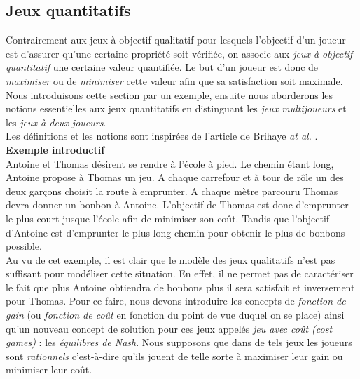 
\subsection{Jeux quantitatifs }

Contrairement aux jeux à objectif qualitatif pour lesquels l'objectif d'un joueur est d'assurer qu'une certaine propriété soit vérifiée, on associe aux \textit{jeux à objectif quantitatif} une certaine valeur quantifiée. Le but d'un joueur est donc de \textit{maximiser} ou de \textit{minimiser} cette valeur afin que sa satisfaction soit maximale.\\

Nous introduisons cette section par un exemple, ensuite nous aborderons les notions essentielles aux jeux quantitatifs en distinguant les \textit{jeux multijoueurs} et les \textit{jeux à deux joueurs}.\\
Les définitions et les notions sont inspirées de l'article de Brihaye \emph{at al.} \cite{DBLP:conf/lfcs/BrihayePS13}.\\

\noindent\textbf {Exemple introductif} \\
\indent Antoine et Thomas désirent se rendre à l'école à pied. Le chemin étant long, Antoine propose à Thomas un jeu. A chaque carrefour et à tour de rôle un des deux garçons choisit la route à emprunter. A chaque mètre parcouru Thomas devra donner un bonbon à Antoine. L'objectif de Thomas est donc d'emprunter le plus court jusque l'école afin de minimiser son coût. Tandis que l'objectif d'Antoine est d'emprunter le plus long chemin pour obtenir le plus de bonbons possible.\\

Au vu de cet exemple, il est clair que le modèle des jeux qualitatifs n'est pas suffisant pour modéliser cette situation. En effet, il ne permet pas de caractériser le fait que plus Antoine obtiendra de bonbons plus il sera satisfait et inversement pour Thomas. Pour ce faire, nous devons introduire les concepts de \textit{fonction de gain} (ou \textit{fonction de coût} en fonction du point de vue duquel on se place) ainsi qu'un nouveau concept de solution pour ces jeux appelés \textit{jeu avec coût (cost games)} : les \textit{équilibres de Nash}. Nous supposons que dans de tels jeux les joueurs sont \textit{rationnels} c'est-à-dire qu'ils jouent de telle sorte à maximiser leur gain ou minimiser leur coût.\\





